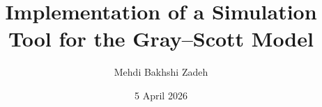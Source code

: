 \documentclass{tubaf-report}
\begin{document}
\title{Implementation of a Simulation Tool for the Gray--Scott Model}
\subtitle{}
\author{Mehdi Bakhshi Zadeh}
\date{5 April 2026}
\subject{Personal Programming Project}
\publishers{%
Computational Materials Science\\
Fakult\"at IV\\[1.5em]
Matriculation Number: 69524\\[1.5em]
Supervised by\\
Dr.\ rer.\ nat.\ habil.\ Uwe Pr\"ufert\\[1.5em]
Professor In Charge \\
Prof.\ Dr.-Ing.\ habil.\ Bernhard Eidel\\
Dr.-Ing.\ habil.\ Arun Prakash\\
Dr.-Ing.\ Stefan Pr\"uger
}

\maketitle


\let\cleardoublepage\clearpage

\tableofcontents
\listoffigures
\listoftables


\clearpage














\appendix


\cleardoublepage
\renewcommand{\bibname}{Literature}




\end{document}
